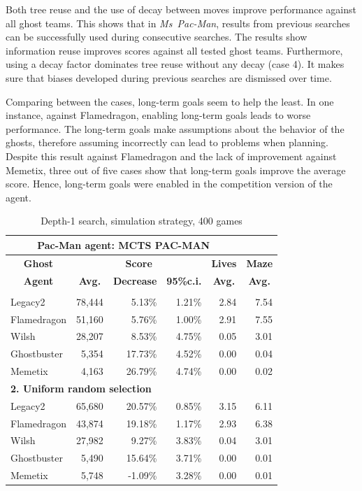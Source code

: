 \documentclass[journal]{IEEEtran}
\begin{document}
Both tree reuse and the use of decay between moves improve performance against all ghost teams. This shows that in {\it{Ms~Pac-Man}}, results from previous searches can be successfully used during consecutive searches. The results show information reuse improves scores against all tested ghost teams. Furthermore, using a decay factor dominates tree reuse without any decay (case 4). It makes sure that biases developed during previous searches are dismissed over time.

Comparing between the cases, long-term goals seem to help the least. In one instance, against {\sc Flamedragon}, enabling long-term goals leads to worse performance. The long-term goals make assumptions about the behavior of the ghosts, therefore assuming incorrectly can lead to problems when planning. Despite this result against {\sc Flamedragon} and the lack of improvement against {\sc Memetix}, three out of five cases show that long-term goals improve the average score. Hence, long-term goals were enabled in the competition version of the agent. 

\begin{table}[htbp]
  \centering
  \caption{Depth-1 search, simulation strategy, 400 games}
    \begin{tabular}{lrrrrr}
    \toprule
    \multicolumn{5}{c}{\textbf{Pac-Man agent: MCTS PAC-MAN}} \\
    \midrule
\multicolumn{1}{c}{\textbf{Ghost}} & \multicolumn{3}{c}{\textbf{Score}} & \multicolumn{1}{c}{\textbf{Lives}} & \multicolumn{1}{c}{\textbf{Maze}} \\
    \multicolumn{1}{c}{\textbf{Agent}} & \multicolumn{1}{c}{\textbf{Avg.}} & \multicolumn{1}{c}{\textbf{Decrease}} & \multicolumn{1}{c}{\textbf{95\%c.i.}} & \multicolumn{1}{c}{\textbf{Avg.}} & \multicolumn{1}{c}{\textbf{Avg.}} \\ \noalign{\smallskip}
    \multicolumn{6}{l}{\textbf{1. UCT selection}} \\
    {\sc Legacy2 } & 78,444 & 5.13\% & 1.21\% & 2.84  & 7.54 \\
    {\sc Flamedragon } & 51,160 & 5.76\% & 1.00\% & 2.91  & 7.55 \\
    {\sc Wilsh } & 28,207 & 8.53\% & 4.75\% & 0.05  & 3.01 \\
    {\sc Ghostbuster } & 5,354 & 17.73\% & 4.52\% & 0.00  & 0.04 \\
    {\sc Memetix } & 4,163 & 26.79\% & 4.74\% & 0.00  & 0.02 \\
    \multicolumn{6}{l}{\textbf{2. Uniform random selection}} \\
    {\sc Legacy2 } & 65,680 & 20.57\% & 0.85\% & 3.15  & 6.11 \\
    {\sc Flamedragon } & 43,874 & 19.18\% & 1.17\% & 2.93  & 6.38 \\
    {\sc Wilsh } & 27,982 & 9.27\% & 3.83\% & 0.04  & 3.01 \\
    {\sc Ghostbuster } & 5,490 & 15.64\% & 3.71\% & 0.00  & 0.01 \\
    {\sc Memetix } & 5,748 & -1.09\% & 3.28\% & 0.00  & 0.01 \\
    \bottomrule
    \end{tabular}%
  \label{tab:single_ply}%
\end{table}%
\end{document}
